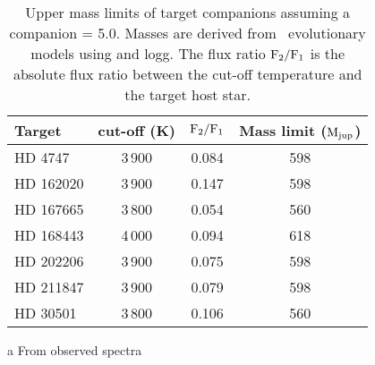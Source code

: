 \begin{table}
       \centering
  \begin{threeparttable}
     
       \caption{Upper mass limits of target companions assuming a companion \logg{} = 5.0. Masses are derived from~\citet{baraffe_new_2015} evolutionary models using \teff{} and logg. The flux ratio \(\rm F_2/F_1\) is  the absolute flux ratio between the cut-off temperature and the target host star.}
      
        \begin{tabular}{l c c c}
            \toprule
            Target & \teff{} cut-off (K) & \(\rm F_2/F_1\) & Mass limit (\(\rm M_{jup}\))\\
            \midrule
            {HD 4747}     &  3\,900 & 0.084 & 598 \\ 
            {HD 162020} & 3\,900 & 0.147 & 598 \\
            {HD 167665} & 3\,800 & 0.054 & 560 \\
            {HD 168443} & 4\,000 & 0.094 & 618 \\
            {HD 202206} & 3\,900 & 0.075 & 598 \\
            {HD 211847} & 3\,900 & 0.079 & 598 \\
            {HD 30501}   & 3\,800\tnote{a} & 0.106 & 560 \\
            \bottomrule
        \end{tabular}
        \label{tab:mass_limits}
        \begin{tablenotes}[flushleft]
            \small
                \item [a] {From observed spectra }
        \end{tablenotes}
  \end{threeparttable}

\end{table}

